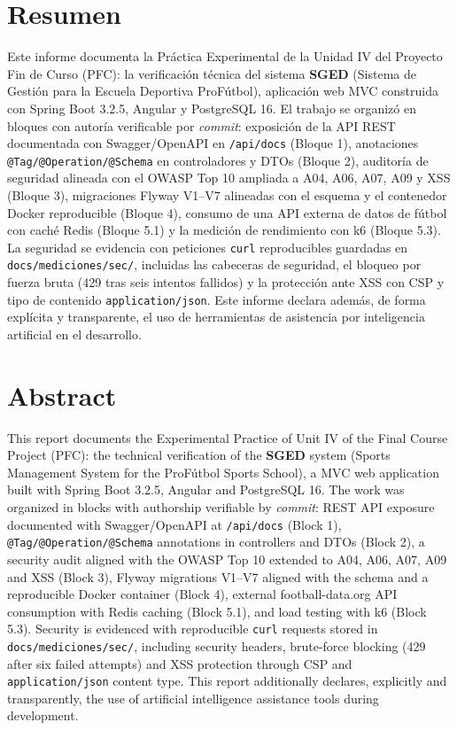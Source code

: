 \documentclass[11pt,a4paper]{article}
\newcommand{\ruta}[1]{\texttt{\footnotesize #1}}
\begin{document}
\tableofcontents
\newpage

\section*{Resumen}

Este informe documenta la Práctica Experimental de la Unidad IV del Proyecto
Fin de Curso (PFC): la verificación técnica del sistema \textbf{SGED}
(Sistema de Gestión para la Escuela Deportiva ProFútbol), aplicación web MVC
construida con Spring Boot 3.2.5, Angular y PostgreSQL 16. El trabajo se
organizó en bloques con autoría verificable por \emph{commit}: exposición de
la API REST documentada con Swagger/OpenAPI en \texttt{/api/docs} (Bloque 1),
anotaciones \texttt{@Tag/@Operation/@Schema} en controladores y DTOs (Bloque
2), auditoría de seguridad alineada con el OWASP Top 10 ampliada a A04, A06,
A07, A09 y XSS (Bloque 3), migraciones Flyway V1--V7 alineadas con el esquema
y el contenedor Docker reproducible (Bloque 4), consumo de una API externa de
datos de fútbol con caché Redis (Bloque 5.1) y la medición de rendimiento con
k6 (Bloque 5.3). La seguridad se evidencia con peticiones \texttt{curl}
reproducibles guardadas en \ruta{docs/mediciones/sec/}, incluidas las
cabeceras de seguridad, el bloqueo por fuerza bruta (429 tras seis intentos
fallidos) y la protección ante XSS con CSP y tipo de contenido
\texttt{application/json}. Este informe declara además, de forma explícita y
transparente, el uso de herramientas de asistencia por inteligencia
artificial en el desarrollo.

\section*{Abstract}

This report documents the Experimental Practice of Unit IV of the Final
Course Project (PFC): the technical verification of the \textbf{SGED} system
(Sports Management System for the ProFútbol Sports School), a MVC web
application built with Spring Boot 3.2.5, Angular and PostgreSQL 16. The work
was organized in blocks with authorship verifiable by \emph{commit}: REST API
exposure documented with Swagger/OpenAPI at \texttt{/api/docs} (Block 1),
\texttt{@Tag/@Operation/@Schema} annotations in controllers and DTOs (Block
2), a security audit aligned with the OWASP Top 10 extended to A04, A06, A07,
A09 and XSS (Block 3), Flyway migrations V1--V7 aligned with the schema and a
reproducible Docker container (Block 4), external football-data.org API
consumption with Redis caching (Block 5.1), and load testing with k6 (Block
5.3). Security is evidenced with reproducible \texttt{curl} requests stored
in \ruta{docs/mediciones/sec/}, including security headers, brute-force
blocking (429 after six failed attempts) and XSS protection through CSP and
\texttt{application/json} content type. This report additionally declares,
explicitly and transparently, the use of artificial intelligence assistance
tools during development.
\end{document}
